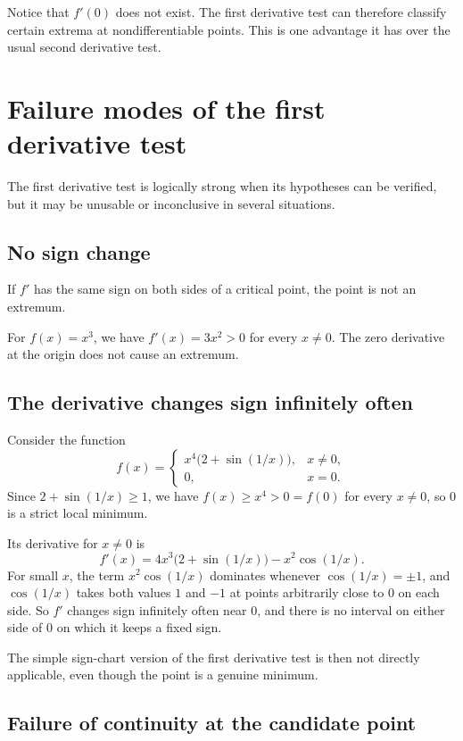 \documentclass{essay}
\begin{document}
Notice that \(f'(0)\) does not exist. The first derivative test can therefore classify certain extrema at nondifferentiable points. This is one advantage it has over the usual second derivative test.

\section{Failure modes of the first derivative test}

The first derivative test is logically strong when its hypotheses can be verified, but it may be unusable or inconclusive in several situations.

\subsection{No sign change}

If \(f'\) has the same sign on both sides of a critical point, the point is not an extremum.

For \(f(x)=x^{3}\), we have \(f'(x)=3x^{2}>0\) for every \(x\neq0\). The zero derivative at the origin does not cause an extremum.

\subsection{The derivative changes sign infinitely often}

Consider the function
\[
  f(x)=
  \begin{cases}
    x^{4}\bigl(2+\sin(1/x)\bigr), & x\neq0,\\
    0, & x=0.
  \end{cases}
\]
Since \(2+\sin(1/x)\geq1\), we have \(f(x)\geq x^{4}>0=f(0)\) for every \(x\neq0\), so \(0\) is a strict local minimum.

Its derivative for \(x\neq0\) is
\[ f'(x)=4x^{3}\bigl(2+\sin(1/x)\bigr)-x^{2}\cos(1/x). \]
For small \(x\), the term \(x^{2}\cos(1/x)\) dominates whenever \(\cos(1/x)=\pm1\), and \(\cos(1/x)\) takes both values \(1\) and \(-1\) at points arbitrarily close to \(0\) on each side. So \(f'\) changes sign infinitely often near \(0\), and there is no interval on either side of \(0\) on which it keeps a fixed sign.

The simple sign-chart version of the first derivative test is then not directly applicable, even though the point is a genuine minimum.

\subsection{Failure of continuity at the candidate point}
\end{document}
